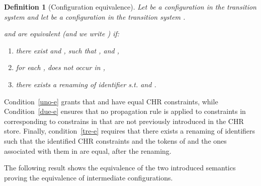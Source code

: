 \documentclass{tlp}
\newtheorem{definition}{Definition} \newtheorem{proposition}{Proposition} \newtheorem{example}{Example} \newtheorem{corollary}{Corollary} \newtheorem{theorem}{Theorem} \newtheorem{lemma}{Lemma}
\begin{document}
\begin{definition}[{\sc Configuration equivalence}]\label{def:PLQA}
 Let
  be a configuration in the transition system  and let   be a configuration in the transition system .

 and  are \emph{equivalent} (and we write
) if:
\begin{enumerate}
\item\label{uno-e}  there exist  and , such that ,  and ,
\item\label{due-e} for each ,  does not occur in ,
\item\label{tre-e} there exists a renaming of identifier  s.t.  and
.
\end{enumerate}
\end{definition}
Condition~\ref{uno-e} grants that  and  have equal
CHR constraints, while Condition~\ref{due-e} ensures that no propagation rule is applied to constraints in  corresponding to constrains in  that are not previously
introduced in the CHR store. Finally, condition~\ref{tre-e} requires that there exists a renaming of identifiers such that
the identified CHR constraints  and the tokens of 
and the ones associated with them in  are equal, after the renaming.

The following result shows the equivalence of the two introduced
semantics proving the equivalence of intermediate configurations.
\end{document}
